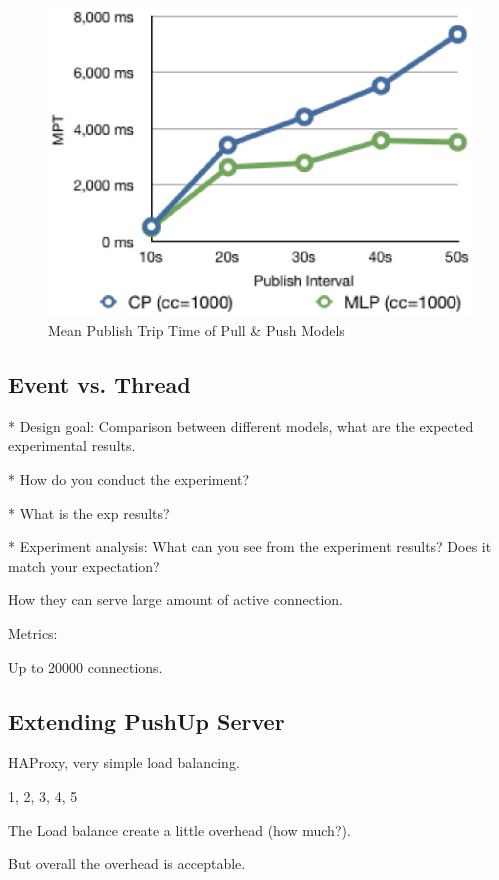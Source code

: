 \begin{figure}[htb!]
\centering%
    \includegraphics[scale=0.60]{figures/latency.eps}
    \caption{Mean Publish Trip Time of Pull \& Push Models}
    \label{fig:traffic_latency}
\end{figure}

\subsection{Event vs. Thread\\}

* Design goal: Comparison between different models, what are the expected experimental results.

* How do you conduct the experiment?

* What is the exp results?

* Experiment analysis: What can you see from the experiment results? Does it match your expectation?


How they can serve large amount of active connection.

Metrics:

Up to 20000 connections.

\subsection{Extending PushUp Server}

HAProxy, very simple load balancing.

1, 2, 3, 4, 5

The Load balance create a little overhead (how much?).

But overall the overhead is acceptable.




